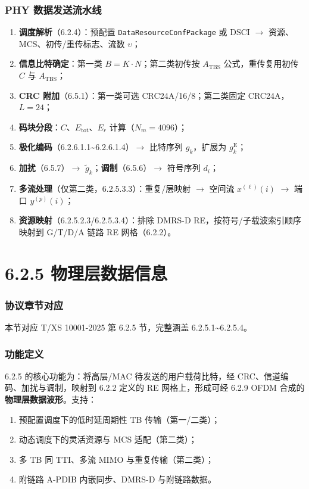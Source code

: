 \documentclass[11pt,a4paper]{ctexart}
\begin{document}
\section{PHY 数据发送流水线}

\begin{enumerate}[nosep]
  \item \textbf{调度解析}（6.2.4）：预配置 \texttt{DataResourceConfPackage} 或 DSCI $\rightarrow$ 资源、MCS、初传/重传标志、流数 $\upsilon$；
  \item \textbf{信息比特确定}：第一类 $B=K{\cdot}N$；第二类初传按 $A_{\mathrm{TBS}}$ 公式，重传复用初传 $C$ 与 $A_{\mathrm{TBS}}$；
  \item \textbf{CRC 附加}（6.5.1）：第一类可选 CRC24A/16/8；第二类固定 CRC24A，$L=24$；
  \item \textbf{码块分段}：$C$、$E_{\mathrm{tot}}$、$E_r$ 计算（$N_m=4096$）；
  \item \textbf{极化编码}（6.2.6.1.1\textasciitilde 6.2.6.1.4）$\rightarrow$ 比特序列 $g_k$，扩展为 $g^{\mathrm{E}}_k$；
  \item \textbf{加扰}（6.5.7）$\rightarrow$ $\tilde{g}_k$；\textbf{调制}（6.5.6）$\rightarrow$ 符号序列 $d_i$；
  \item \textbf{多流处理}（仅第二类，6.2.5.3.3）：重复/层映射 $\rightarrow$ 空间流 $x^{(\ell)}(i)$ $\rightarrow$ 端口 $y^{(p)}(i)$；
  \item \textbf{资源映射}（6.2.5.2.3/6.2.5.3.4）：排除 DMRS-D RE，按符号/子载波索引顺序映射到 G/T/D/A 链路 RE 网格（6.2.2）。
\end{enumerate}

\newpage
\part{6.2.5 物理层数据信息}

\section{协议章节对应}

本节对应 T/XS 10001-2025 第 6.2.5 节，完整涵盖 6.2.5.1\textasciitilde 6.2.5.4。

\section{功能定义}

6.2.5 的核心功能为：将高层/MAC 待发送的用户载荷比特，经 CRC、信道编码、加扰与调制，映射到 6.2.2 定义的 RE 网格上，形成可经 6.2.9 OFDM 合成的\textbf{物理层数据波形}。支持：
\begin{enumerate}[nosep]
  \item 预配置调度下的低时延周期性 TB 传输（第一/二类）；
  \item 动态调度下的灵活资源与 MCS 适配（第二类）；
  \item 多 TB 同 TTI、多流 MIMO 与重复传输（第二类）；
  \item 附链路 A-PDIB 内嵌同步、DMRS-D 与附链路数据。
\end{enumerate}
\end{document}

